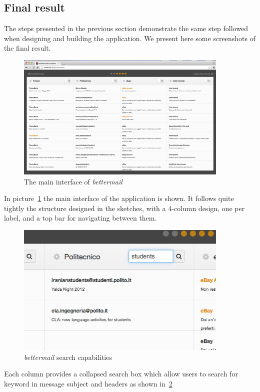 \documentclass[a4paper,12pt]{report}
\begin{document}
\subsection{Final result}

The steps presented in the previous section demonstrate the same step followed when designing and building the application. We present here some screenshots of the final result.

\begin{figure}[H]
  \centering
  \includegraphics[width=4in]{main}
  \caption{The main interface of \emph{bettermail}}
  \label{fig:main}
\end{figure}
In picture~\ref{fig:main} the main interface of the application is shown. It follows quite tightly the structure designed in the sketches, with a 4-column design, one per label, and a top bar for navigating between them.

\begin{figure}[H]
  \centering
  \includegraphics[width=4in]{main_search}
  \caption{\emph{bettermail} search capabilities}
  \label{fig:main_search}
\end{figure}
Each column provides a collapsed search box which allow users to search for keyword in message subject and headers as shown in~\ref{fig:main_search}
\end{document}
